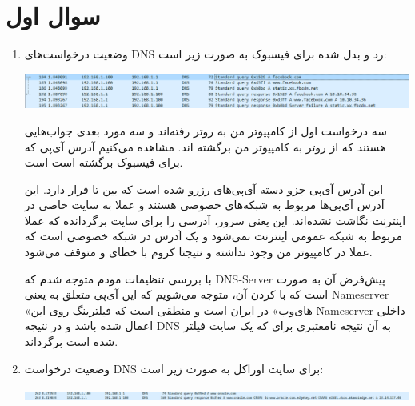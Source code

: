 \documentclass[12pt]{article}
\begin{document}
	\KashidaOff
	
	\section{سوال اول}
	
	\begin{enumerate}
		
		\item
		
		وضعیت درخواست‌های DNS رد و بدل شده برای فیسبوک به صورت زیر است:
		
		\begin{center}
			\includegraphics[width = 1.0 \textwidth]{images/1.png}
		\end{center}

سه درخواست اول از کامپیوتر من به روتر رفته‌اند و سه مورد بعدی جواب‌هایی هستند که از روتر به کامپیوتر من برگشته اند. مشاهده می‌کنیم آدرس آی‌پی که برای فیسبوک برگشته است
است.

این آدرس آی‌پی جزو دسته آی‌پی‌های رزرو شده است که بین
تا
قرار دارد. این آدرس آی‌پی‌ها مربوط به شبکه‌های خصوصی هستند و عملا به سایت خاصی در اینترنت نگاشت نشده‌اند. این یعنی  سرور، آدرسی را برای سایت  برگردانده که عملا مربوط به شبکه عمومی اینترنت نمی‌شود و یک آدرس در شبکه خصوصی است که عملا در کامپیوتر من وجود  نداشته و نتیجتا کروم با خطای
و
متوقف می‌شود.
	
	با بررسی تنظیمات مودم متوجه شدم که DNS-Server پیش‌فرض آن به صورت  است که با  کردن آن، متوجه می‌شویم که این آی‌پی متعلق به  یعنی Nameserver «های‌وب» در ایران است و منطقی است که فیلترینگ روی این Nameserver داخلی اعمال شده باشد و در نتیجه DNS به آن نتیجه نامعتبری برای  که یک سایت فیلتر شده است برگرداند.
	
	
	\item
	
	وضعیت درخواست DNS برای سایت اوراکل به صورت زیر است:
	
		\begin{center}
		\includegraphics[width = 1.0 \textwidth]{images/2.png}
	\end{center}
	

\end{enumerate}
\end{document}
